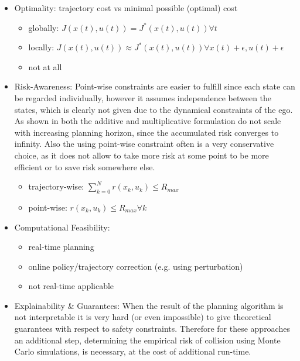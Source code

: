 \begin{itemize}
    \item Optimality: trajectory cost vs minimal possible (optimal) cost
    \begin{itemize}
        \item globally: $J(x(t), u(t)) = J^*(x(t), u(t)) \forall t$
        \item locally: $J(x(t), u(t)) \approx J^*(x(t), u(t)) \forall x(t) + \epsilon, u(t) + \epsilon $
        \item not at all
    \end{itemize}
    
    \item Risk-Awareness: Point-wise constraints are easier to fulfill since each state can be regarded individually, however it assumes independence between the states, which is clearly not given due to the dynamical constraints of the ego. As shown in \cite{JansonSP15} both the additive and multiplicative formulation do not scale with increasing planning horizon, since the accumulated risk converges to infinity. Also the using point-wise constraint often is a very conservative choice, as it does not allow to take more risk at some point to be more efficient or to save risk somewhere else. 
    \begin{itemize}
        \item trajectory-wise: $\sum_{k = 0}^N r(x_k, u_k) \leq R_{max}$
        \item point-wise: $r(x_k, u_k) \leq R_{max} \forall k$
    \end{itemize}

    \item Computational Feasibility:  
    \begin{itemize}
        \item real-time planning
        \item online policy/trajectory correction (e.g. using perturbation) 
        \item not real-time applicable
    \end{itemize}
    
    \item Explainability \& Guarantees: When the result of the planning algorithm is not interpretable it is very hard (or even impossible) to give theoretical guarantees with respect to safety constraints. Therefore for these approaches an additional step, determining the empirical risk of collision using Monte Carlo simulations, is necessary, at the cost of additional run-time.  
\end{itemize}

